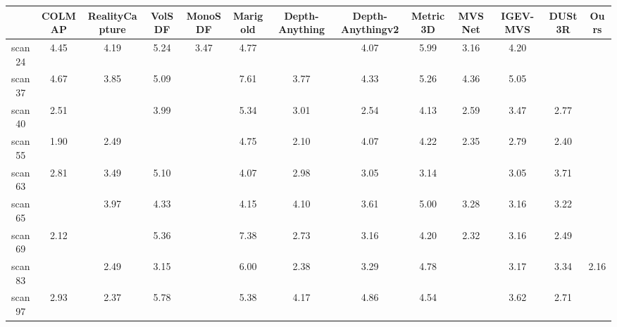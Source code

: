   \begin{table}[t]
\centering
\setlength{\tabcolsep}{1.5pt}
\vspace{-5pt}
\begin{tabular}{ccccccccccccc}
\toprule
& \footnotesize{COLMAP} & \scriptsize{RealityCapture} & \small{VolSDF} & \small{MonoSDF} & \small{Marigold} & \tiny{Depth-Anything} & \tiny{Depth-Anythingv2} & \small{Metric3D} & \small{MVSNet} & \scriptsize{IGEV-MVS} & \small{DUSt3R} & \small{Ours} \\
\midrule
scan24 & 4.45 & 4.19 & 5.24 & 3.47 & 4.77 & \cellcolor{yellow}{2.99} & 4.07 & 5.99 & 3.16 & 4.20 & \cellcolor{orange}{2.24} & \cellcolor{red}{1.31} \\
scan37 & 4.67 & 3.85 & 5.09 & \cellcolor{yellow}{3.61} & 7.61 & 3.77 & 4.33 & 5.26 & 4.36 & 5.05 & \cellcolor{orange}{3.43} & \cellcolor{red}{3.14} \\
scan40 & 2.51 & \cellcolor{yellow}{2.26} & 3.99 & \cellcolor{orange}{2.10} & 5.34 & 3.01 & 2.54 & 4.13 & 2.59 & 3.47 & 2.77 & \cellcolor{red}{1.53} \\
scan55 & 1.90 & 2.49 & \cellcolor{yellow}{1.42} & \cellcolor{orange}{1.05} & 4.75 & 2.10 & 4.07 & 4.22 & 2.35 & 2.79 & 2.40 & \cellcolor{red}{0.92} \\
scan63 & 2.81 & 3.49 & 5.10 & \cellcolor{yellow}{2.37} & 4.07 & 2.98 & 3.05 & 3.14 & \cellcolor{orange}{1.88} & 3.05 & 3.71 & \cellcolor{red}{1.19} \\
scan65 & \cellcolor{yellow}{2.92} & 3.97 & 4.33 & \cellcolor{red}{1.38} & 4.15 & 4.10 & 3.61 & 5.00 & 3.28 & 3.16 & 3.22 & \cellcolor{orange}{1.98} \\
scan69 & 2.12 & \cellcolor{yellow}{1.91} & 5.36 & \cellcolor{orange}{1.41} & 7.38 & 2.73 & 3.16 & 4.20 & 2.32 & 3.16 & 2.49 & \cellcolor{red}{1.25} \\
scan83 & \cellcolor{yellow}{2.05} & 2.49 & 3.15 & \cellcolor{red}{1.85} & 6.00 & 2.38 & 3.29 & 4.78 & \cellcolor{orange}{1.88} & 3.17 & 3.34 & 2.16 \\
scan97 & 2.93 & 2.37 & 5.78 & \cellcolor{orange}{1.74} & 5.38 & 4.17 & 4.86 & 4.54 & \cellcolor{yellow}{1.87} & 3.62 & 2.71 & \cellcolor{red}{1.40} \\

\end{tabular}
\end{table}
